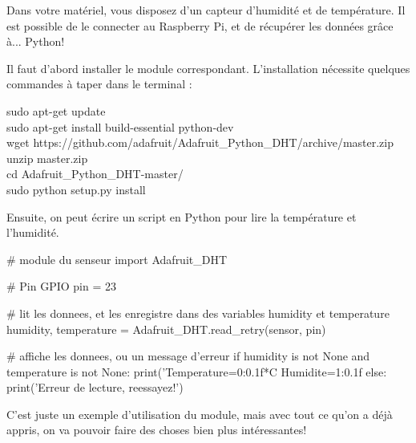 Dans votre matériel, vous disposez d'un capteur d'humidité et de température. Il est possible de le connecter au Raspberry Pi, et de récupérer les données grâce à... Python!

Il faut d'abord installer le module correspondant. L'installation nécessite quelques commandes à taper dans le terminal :\\
\begin{lstlistings}
sudo apt-get update\\
sudo apt-get install build-essential python-dev\\
wget https://github.com/adafruit/Adafruit\_Python\_DHT/archive/master.zip\\
unzip master.zip\\
cd Adafruit\_Python\_DHT-master/\\
sudo python setup.py install\\
\end{lstlistings}

Ensuite, on peut écrire un script en Python pour lire la température et l'humidité.

\begin{python}
# module du senseur
import Adafruit_DHT

# Pin GPIO
pin = 23

# lit les donnees, et les enregistre dans des variables humidity et temperature
humidity, temperature = Adafruit_DHT.read_retry(sensor, pin)

# affiche les donnees, ou un message d'erreur
if humidity is not None and temperature is not None:
    print('Temperature={0:0.1f}*C  Humidite={1:0.1f}%
else:
    print('Erreur de lecture, reessayez!')
\end{python}

C'est juste un exemple d'utilisation du module, mais avec tout ce qu'on a déjà appris, on va pouvoir faire des choses bien plus intéressantes!